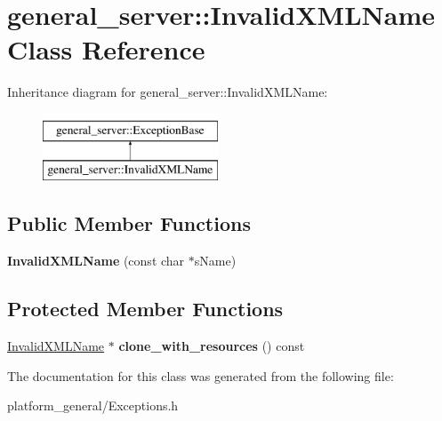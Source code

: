 \hypertarget{classgeneral__server_1_1InvalidXMLName}{\section{general\-\_\-server\-:\-:\-Invalid\-X\-M\-L\-Name \-Class \-Reference}
\label{classgeneral__server_1_1InvalidXMLName}
}
\-Inheritance diagram for general\-\_\-server\-:\-:\-Invalid\-X\-M\-L\-Name\-:\begin{figure}[H]
\begin{center}
\leavevmode
\includegraphics[height=2.000000cm]{classgeneral__server_1_1InvalidXMLName}
\end{center}
\end{figure}
\subsection*{\-Public \-Member \-Functions}
\begin{DoxyCompactItemize}
\item 
\hypertarget{classgeneral__server_1_1InvalidXMLName_af655ba0f2eed99dc995606c8d5397e7f}{{\bfseries \-Invalid\-X\-M\-L\-Name} (const char $\ast$s\-Name)}\label{classgeneral__server_1_1InvalidXMLName_af655ba0f2eed99dc995606c8d5397e7f}

\end{DoxyCompactItemize}
\subsection*{\-Protected \-Member \-Functions}
\begin{DoxyCompactItemize}
\item 
\hypertarget{classgeneral__server_1_1InvalidXMLName_a5cd9ab059f3a28e57867ed275d86c9ce}{\hyperlink{classgeneral__server_1_1InvalidXMLName}{\-Invalid\-X\-M\-L\-Name} $\ast$ {\bfseries clone\-\_\-with\-\_\-resources} () const }\label{classgeneral__server_1_1InvalidXMLName_a5cd9ab059f3a28e57867ed275d86c9ce}

\end{DoxyCompactItemize}


\-The documentation for this class was generated from the following file\-:\begin{DoxyCompactItemize}
\item 
platform\-\_\-general/\-Exceptions.\-h\end{DoxyCompactItemize}
